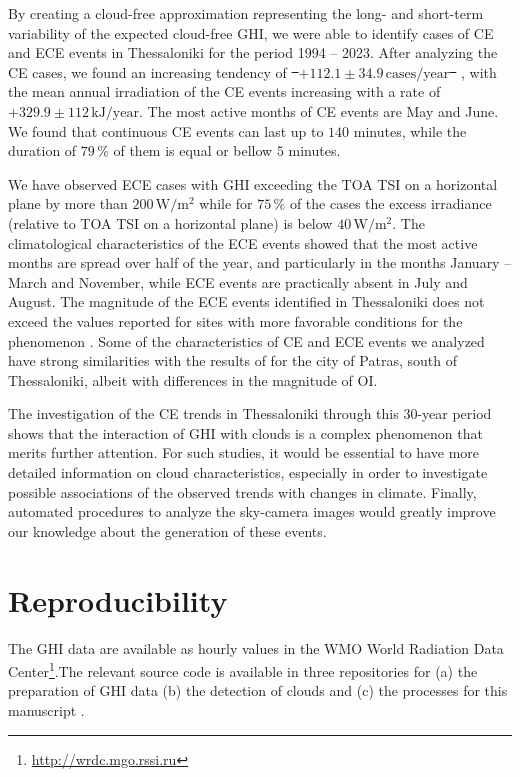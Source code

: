 \documentclass[preprint, 5p,
authoryear]{elsarticle} %
\providecommand{\DIFaddtex}[1]{{\protect\color{blue}\uwave{#1}}} %
\providecommand{\DIFdeltex}[1]{{\protect\color{red}\sout{#1}}}                      %
\providecommand{\DIFaddbegin}{} %
\providecommand{\DIFaddend}{} %
\providecommand{\DIFdelbegin}{} %
\providecommand{\DIFdelend}{} %
\providecommand{\DIFadd}[1]{\texorpdfstring{\DIFaddtex{#1}}{#1}} %
\providecommand{\DIFdel}[1]{\texorpdfstring{\DIFdeltex{#1}}{}} %
\newcommand{\DIFscaledelfig}{0.5}
\newlength{\DIFdelgraphicswidth} %
\newlength{\DIFdelgraphicsheight} %
\newcommand{\DIFaddincludegraphics}[2][]{{\color{blue}\fbox{\DIFOincludegraphics[#1]{#2}}}} %
\newcommand{\DIFdelincludegraphics}[2][]{%
\sbox{\DIFdelgraphicsbox}{\DIFOincludegraphics[#1]{#2}}%
\settoboxwidth{\DIFdelgraphicswidth}{\DIFdelgraphicsbox} %
\settoboxtotalheight{\DIFdelgraphicsheight}{\DIFdelgraphicsbox} %
\scalebox{\DIFscaledelfig}{%
\parbox[b]{\DIFdelgraphicswidth}{\usebox{\DIFdelgraphicsbox}\\[-\baselineskip] \rule{\DIFdelgraphicswidth}{0em}}\llap{\resizebox{\DIFdelgraphicswidth}{\DIFdelgraphicsheight}{%
\setlength{\unitlength}{\DIFdelgraphicswidth}%
\begin{picture}(1,1)%
\thicklines\linethickness{2pt} %
{\color[rgb]{1,0,0}\put(0,0){\framebox(1,1){}}}%
{\color[rgb]{1,0,0}\put(0,0){\line( 1,1){1}}}%
{\color[rgb]{1,0,0}\put(0,1){\line(1,-1){1}}}%
\end{picture}%
}\hspace*{3pt}}} %
} %
\DeclareRobustCommand{\DIFaddbegin}{\DIFOaddbegin \let\includegraphics\DIFaddincludegraphics} %
\DeclareRobustCommand{\DIFaddend}{\DIFOaddend \let\includegraphics\DIFOincludegraphics} %
\DeclareRobustCommand{\DIFdelbegin}{\DIFOdelbegin \let\includegraphics\DIFdelincludegraphics} %
\DeclareRobustCommand{\DIFdelend}{\DIFOaddend \let\includegraphics\DIFOincludegraphics} %
\begin{document}
By creating a cloud-free approximation representing the long- and
short-term variability of the expected cloud-free GHI, we were able to
identify cases of CE and ECE events in Thessaloniki for the period 1994
-- 2023. After analyzing the CE cases, we found an increasing tendency
of \DIFdelbegin \DIFdel{%
\mbox{%
\(+112.1\pm 34.9\,\text{cases}/\text{year}\)
}%
}\DIFdelend \DIFaddbegin \DIFadd{%
\mbox{%
\(+113.4\pm 35.5\,\text{cases}/\text{year}\)
}%
}\DIFaddend , with the mean annual
irradiation of the CE events increasing with a rate of
\DIFdelbegin \DIFdel{\(+329.9\pm 112\,\text{kJ}/\text{year}\)}\DIFdelend \DIFaddbegin \DIFadd{\(+336.2\pm 114.1\,\text{kJ}/\text{year}\)}\DIFaddend . The most active months of CE
events are May and June. We found that continuous CE events can last up
to \(140\) minutes, while the duration of \(79\,\%\) of them is equal or
bellow \(5\) minutes.

We have observed ECE cases with GHI exceeding the TOA TSI on a
horizontal plane by more than \(200\,\text{W}/\text{m}^{2}\) while for
\(75\,\%\) of the cases the excess irradiance (relative to TOA TSI on a
horizontal plane) is below \(40\,\text{W}/\text{m}^{2}\). The
climatological characteristics of the ECE events showed that the most
active months are spread over half of the year, and particularly in the
months January -- March and November, while ECE events are practically
absent in July and August. The magnitude of the ECE events identified in
Thessaloniki does not exceed the values reported for sites with more
favorable conditions for the phenomenon \citep[e.g.,][]{Cordero2023}.
Some of the characteristics of CE and ECE events we analyzed have strong
similarities with the results of \citet{Vamvakas2020} for the city of
Patras, south of Thessaloniki, albeit with differences in the magnitude
of OI.

The investigation of the CE trends in Thessaloniki through this 30-year
period shows that the interaction of GHI with clouds is a complex
phenomenon that merits further attention. For such studies, it would be
essential to have more detailed information on cloud characteristics,
especially in order to investigate possible associations of the observed
trends with changes in climate. Finally, automated procedures to analyze
the sky-camera images would greatly improve our knowledge about the
generation of these events.

\hypertarget{reproducibility}{%
\section*{Reproducibility}\label{reproducibility}}

The GHI data are available as hourly values in the WMO World Radiation
Data Center\footnote{\url{http://wrdc.mgo.rssi.ru}}.The relevant source
code is available in three repositories for (a) the preparation of GHI
data \citep{natsis_2024_13744467} (b) the detection of clouds
\citep{thanasis_n_2024_13744460} and (c) the processes for this
manuscript \citep{thanasis_n_2024_13744472}.


\end{document}
